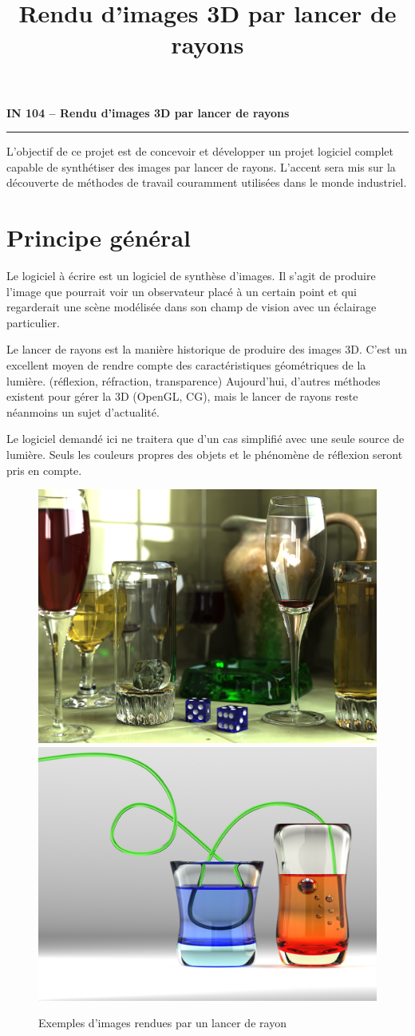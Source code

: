 \documentclass[10pt, a4paper ]{article}
\title{Rendu d'images 3D par lancer de rayons}
\begin{document}
\noindent
\textbf{\textsf{\large IN 104 -- Rendu d'images 3D par lancer de rayons }}
\vskip1mm\hrule%


\begin{minipage}{.9\textwidth} \sf L'objectif de ce projet est de concevoir et
    développer un projet logiciel complet capable de synthétiser des images par
    lancer de rayons. L'accent sera mis sur la découverte de méthodes de travail
    couramment utilisées dans le monde industriel.  \end{minipage}


\section{Principe général}

Le logiciel à écrire est un logiciel de synthèse d'images. Il s'agit
de produire l'image que pourrait voir un observateur placé à un certain
point et qui regarderait une scène modélisée dans son champ de vision avec un
éclairage particulier.

Le lancer de rayons est la manière historique de produire des images 3D. C'est
un excellent moyen de rendre compte des caractéristiques géométriques de la
lumière. (réflexion, réfraction, transparence) Aujourd'hui, d'autres méthodes
existent pour gérer la 3D (OpenGL, CG), mais le lancer de rayons reste néanmoins
un sujet d'actualité.

Le logiciel demandé ici ne traitera que d'un cas simplifié avec une seule source
de lumière. Seuls les couleurs propres des objets et le phénomène de réflexion
seront pris en compte.

\begin{figure}[h]
    \centering
    \hfill
    \includegraphics[width=.40\textwidth] {../../img/glass_dice.png}
    \hfill
    \includegraphics[width=.40\textwidth] {../../img/glass_straw.png}
    \hfill\mbox{}
    \caption{Exemples d'images rendues par un lancer de rayon}
    \label{fig:sample}
\end{figure}
\end{document}
